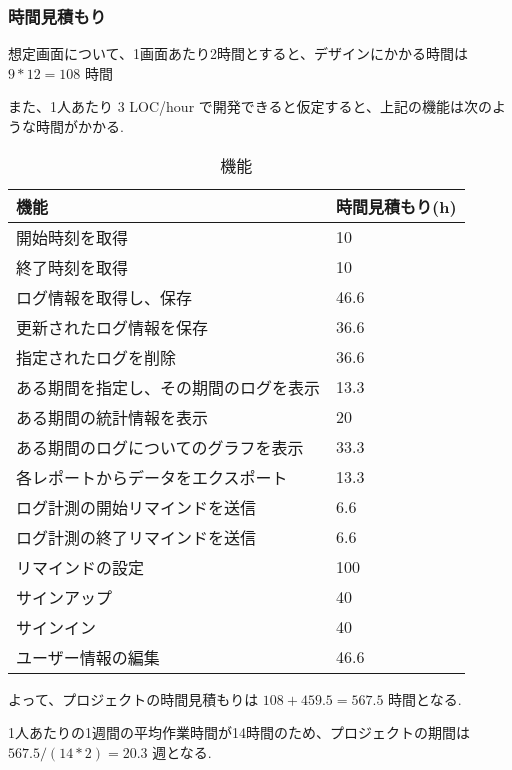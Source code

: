 \subsubsection{時間見積もり}

想定画面について、1画面あたり2時間とすると、デザインにかかる時間は $9 * 12 = 108$ 時間

また、1人あたり 3 LOC/hour で開発できると仮定すると、上記の機能は次のような時間がかかる.

\begin{table}[H]
  \centering
  \caption{機能}
  \begin{tabular}{|l|l|}
  \hline
    機能 & 時間見積もり(h) \\
  \hline

  \hline
    開始時刻を取得 & 10 \\
  \hline
    終了時刻を取得 & 10 \\
  \hline
    ログ情報を取得し、保存 & 46.6 \\
  \hline
    更新されたログ情報を保存 & 36.6 \\
  \hline
    指定されたログを削除 & 36.6 \\
  \hline

  \hline
    ある期間を指定し、その期間のログを表示 & 13.3 \\
  \hline
    ある期間の統計情報を表示 & 20 \\
  \hline
    ある期間のログについてのグラフを表示 & 33.3 \\
  \hline
    各レポートからデータをエクスポート & 13.3 \\
  \hline

  \hline
    ログ計測の開始リマインドを送信 & 6.6 \\
  \hline
    ログ計測の終了リマインドを送信 & 6.6 \\
  \hline
    リマインドの設定 & 100 \\
  \hline

  \hline
    サインアップ & 40 \\
  \hline
    サインイン & 40 \\
  \hline
    ユーザー情報の編集 & 46.6 \\
  \hline
  \end{tabular}
\end{table}

よって、プロジェクトの時間見積もりは $108 + 459.5 = 567.5$ 時間となる.

1人あたりの1週間の平均作業時間が14時間のため、プロジェクトの期間は $567.5 / (14 * 2) = 20.3$ 週となる. \\

